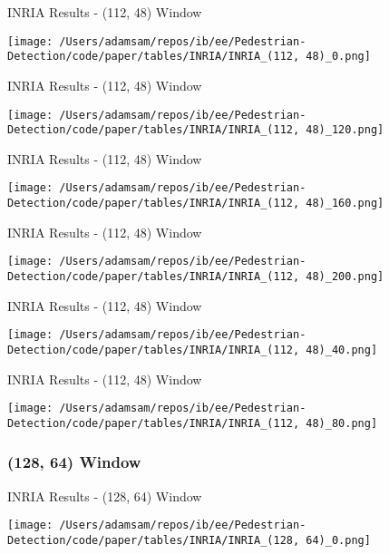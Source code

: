 \begin{table}
    \caption{INRIA Results - (112, 48) Window}
    \texttt{[image: /Users/adamsam/repos/ib/ee/Pedestrian-Detection/code/paper/tables/INRIA/INRIA\_(112, 48)\_0.png]}
    \label{tab:INRIA_(112, 48)_0}
\end{table}

\begin{table}
    \caption{INRIA Results - (112, 48) Window}
    \texttt{[image: /Users/adamsam/repos/ib/ee/Pedestrian-Detection/code/paper/tables/INRIA/INRIA\_(112, 48)\_120.png]}
    \label{tab:INRIA_(112, 48)_120}
\end{table}

\begin{table}
    \caption{INRIA Results - (112, 48) Window}
    \texttt{[image: /Users/adamsam/repos/ib/ee/Pedestrian-Detection/code/paper/tables/INRIA/INRIA\_(112, 48)\_160.png]}
    \label{tab:INRIA_(112, 48)_160}
\end{table}

\begin{table}
    \caption{INRIA Results - (112, 48) Window}
    \texttt{[image: /Users/adamsam/repos/ib/ee/Pedestrian-Detection/code/paper/tables/INRIA/INRIA\_(112, 48)\_200.png]}
    \label{tab:INRIA_(112, 48)_200}
\end{table}

\begin{table}
    \caption{INRIA Results - (112, 48) Window}
    \texttt{[image: /Users/adamsam/repos/ib/ee/Pedestrian-Detection/code/paper/tables/INRIA/INRIA\_(112, 48)\_40.png]}
    \label{tab:INRIA_(112, 48)_40}
\end{table}

\begin{table}
    \caption{INRIA Results - (112, 48) Window}
    \texttt{[image: /Users/adamsam/repos/ib/ee/Pedestrian-Detection/code/paper/tables/INRIA/INRIA\_(112, 48)\_80.png]}
    \label{tab:INRIA_(112, 48)_80}
\end{table}

\subsubsection*{(128, 64) Window}

\begin{table}
    \caption{INRIA Results - (128, 64) Window}
    \texttt{[image: /Users/adamsam/repos/ib/ee/Pedestrian-Detection/code/paper/tables/INRIA/INRIA\_(128, 64)\_0.png]}
    \label{tab:INRIA_(128, 64)_0}
\end{table}

